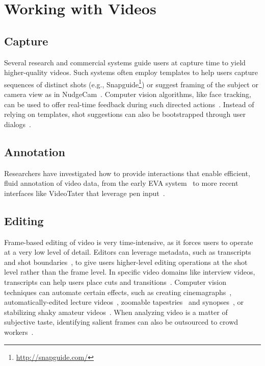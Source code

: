 
\section{Working with Videos}
\label{related_videos}


\subsection{Capture}
Several research and commercial systems guide users at capture time to yield higher-quality videos. Such systems often employ templates to help users capture sequences of distinct shots (e.g., Snapguide\footnote{\url{http://snapguide.com/}}) or suggest framing of the subject or camera view as in NudgeCam~\cite{Carter:2010}. Computer vision algorithms, like face tracking, can be used to offer real-time feedback during such directed actions~\cite{Davis:2003cu,Heer:2004ba,Carter:2010}. Instead of relying on templates, shot suggestions can also be bootstrapped through user dialogs~\cite{Adams:2005}.


\subsection{Annotation}
Researchers have investigated how to provide interactions that enable efficient, fluid annotation of video data, from the early EVA system~\cite{Mackay:1989} to more recent interfaces like VideoTater that leverage pen input~\cite{Diakopoulos:2006vt}.


\subsection{Editing}
Frame-based editing of video is very time-intensive, as it forces users to operate at a very low level of detail. Editors can leverage metadata, such as transcripts~\cite{Berthouzoz:2012,Pavel:2014:VDB:2642918.2647400} and shot boundaries~\cite{Casares:2002dx}, to give users higher-level editing operations at the shot level rather than the frame level.
In specific video domains like interview videos, transcripts can help users place cuts and transitions~\cite{Berthouzoz:2012}.
%
Computer vision techniques can automate certain effects, such as creating cinemagraphs~\cite{Bai:2012, Joshi:2012}, automatically-edited lecture videos~\cite{Heck:2007}, zoomable tapestries~\cite{Barnes:2010} and synopses~\cite{Pritch:2009vl}, or stabilizing shaky amateur videos~\cite{Liu:2011}. When analyzing video is a matter of subjective taste, identifying salient frames can also be outsourced to crowd workers~\cite{Bernstein:2011uj}.

